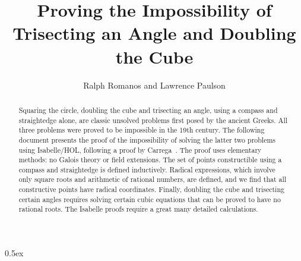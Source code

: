 \documentclass[11pt,a4paper]{article}
\begin{document}
\title{Proving the Impossibility of Trisecting an Angle and Doubling the Cube}
\author{Ralph Romanos and Lawrence Paulson}
\maketitle

\begin{abstract}
Squaring the circle, doubling the cube and trisecting an angle, using a compass and 
straightedge alone, are classic unsolved problems first posed by the ancient Greeks. 
All three problems were proved to be impossible in the 19th century. The following document 
presents the proof of the impossibility of solving the latter two problems using Isabelle/HOL, 
following a proof by Carrega~\cite{Car81}. The proof uses elementary methods: no Galois theory or field 
extensions. 
The set of points constructible using a compass and straightedge is defined inductively. 
Radical expressions, which involve only square roots and arithmetic of rational numbers, 
are defined, and we find that all constructive points have radical coordinates. Finally, 
doubling the cube and trisecting certain angles requires solving certain cubic equations 
that can be proved to have no rational roots. The Isabelle proofs require a great many 
detailed calculations.
\end{abstract}

\tableofcontents

\parindent 0pt\parskip 0.5ex





\end{document}
